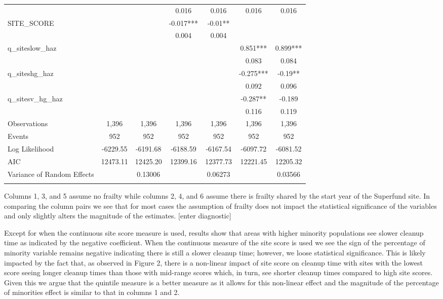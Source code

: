 \documentclass[12pt]{article}
\begin{document}
{\begin{table}[t]
\begin{tabular}{l|cccccc}
        ~ & ~ & ~ & 0.016 & 0.016 & 0.016 & 0.016 \\ 
        SITE\_SCORE & ~ & ~ & -0.017*** & -0.01** & ~ & ~ \\ 
        ~ & ~ & ~ & 0.004 & 0.004 & ~ & ~ \\ 
        q\_siteslow\_haz & ~ & ~ & ~ & ~ & 0.851*** & 0.899*** \\ 
        ~ & ~ & ~ & ~ & ~ & 0.083 & 0.084 \\ 
        q\_siteshg\_haz & ~ & ~ & ~ & ~ & -0.275*** & -0.19** \\ 
        ~ & ~ & ~ & ~ & ~ & 0.092 & 0.096 \\ 
        q\_sitesv\_hg\_haz & ~ & ~ & ~ & ~ & -0.287** & -0.189 \\ 
        ~ & ~ & ~ & ~ & ~ & 0.116 & 0.119 \\ \hline
        Observations & 1,396 & 1,396 & 1,396 & 1,396 & 1,396 & 1,396 \\ 
        Events & 952 & 952 & 952 & 952 & 952 & 952 \\ 
        Log Likelihood & -6229.55 & -6191.68 & -6188.59 & -6167.54 & -6097.72 & -6081.52 \\ 
        AIC & 12473.11 & 12425.20 & 12399.16 & 12377.73 & 12221.45 & 12205.32 \\ 
        Variance of Random Effects & ~ & 0.13006 & ~ & 0.06273 & ~ & 0.03566 \\ 
		\hline
		\addlinespace[1ex]
			\multicolumn{3}{l}{\textsuperscript{***}$p\leq0.01$, 
				\textsuperscript{**}$p\leq0.05$, 
				\textsuperscript{*}$p\leq0.01$}
    \end{tabular}
\end{table}

Columns 1, 3, and 5 assume no frailty while columns 2, 4, and 6 assume there is frailty shared by the start year of the Superfund site. In comparing the column pairs we see that for most cases the assumption of frailty does not impact the statistical significance of the variables and only slightly alters the magnitude of the estimates. [enter diagnostic]

Except for when the continuous site score measure is used, results show that areas with higher minority populations see slower cleanup time as indicated by the negative coefficient. When the continuous measure of the site score is used we see the sign of the percentage of minority variable remains negative indicating there is still a slower cleanup time; however, we loose statistical significance. This is likely impacted by the fact that, as observed in Figure 2, there is a non-linear impact of site score on cleanup time with sites with the lowest score seeing longer cleanup times than those with mid-range scores which, in turn, see shorter cleanup times compared to high site scores. Given this we argue that the quintile measure is a better measure as it allows for this non-linear effect and the magnitude of the percentage of minorities effect is similar to that in columns 1 and 2.

}
\end{document}

